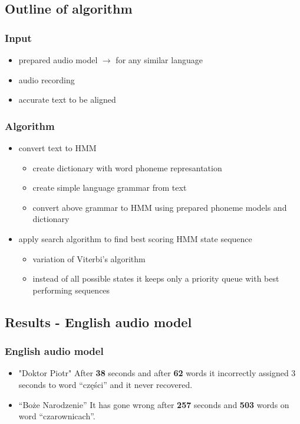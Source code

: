 \documentclass[]{beamer}
\begin{document}
\subsection{Outline of algorithm}
\begin{frame}
    \frametitle{Input}
    \begin{itemize}
        \item prepared audio model $\rightarrow$ for any similar language
        \item audio recording
        \item accurate text to be aligned
    \end{itemize}
\end{frame}
\begin{frame}
    \frametitle{Algorithm}
    \begin{itemize}
        \item convert text to HMM
        \begin{itemize}
            \item create dictionary with word phoneme represantation
            \item create simple language grammar from text
            \item convert above grammar to HMM using prepared phoneme models and dictionary
        \end{itemize}
        \item apply search algorithm to find best scoring HMM state sequence
        \begin{itemize}
            \item variation of Viterbi's algorithm
            \item instead of all possible states it keeps only a priority queue with best performing sequences
        \end{itemize}
    \end{itemize}
\end{frame}
\subsection{Results - English audio model}
\begin{frame}
    \frametitle{English audio model}
    \begin{itemize}
        \item "Doktor Piotr" \newline
        After \textbf{38} seconds and after \textbf{62} words it incorrectly assigned 3 seconds to word “części” and it never recovered.
        \item  “Boże Narodzenie” \newline
        It has gone wrong after \textbf{257} seconds and \textbf{503} words on word “czarownicach”.
    \end{itemize}
\end{frame}
\end{document}
